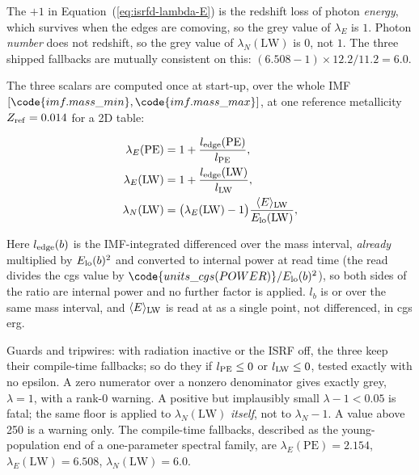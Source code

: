 The $+1$ in
Equation~(\ref{eq:isrfd-lambda-E}) is the redshift loss of photon \emph{energy},
which survives when the edges are comoving, so the grey value of $\lambda_E$ is
$1$. Photon \emph{number} does not redshift, so the grey value of
$\lambda_N(\mathrm{LW})$ is $0$, not $1$. The three shipped fallbacks are mutually
consistent on this: $(6.508 - 1)\times 12.2/11.2 = 6.0$.

The three scalars are computed once at start-up, over the whole IMF
$[\code{imf.mass\_min}, \code{imf.mass\_max}]$, at one reference metallicity
$Z_{\rm ref} = 0.014$ for a 2D table:

\begin{align}
  \lambda_E(\mathrm{PE}) &= 1 + \frac{l_{\rm edge}(\mathrm{PE})}{l_{\rm PE}},
  \label{eq:isrfd-lambda-pe-table} \\
  \lambda_E(\mathrm{LW}) &= 1 + \frac{l_{\rm edge}(\mathrm{LW})}{l_{\rm LW}},
  \label{eq:isrfd-lambda-lw-table} \\
  \lambda_N(\mathrm{LW}) &= \big(\lambda_E(\mathrm{LW}) - 1\big)
    \frac{\langle E\rangle_{\rm LW}}{E_{\rm lo}(\mathrm{LW})},
  \label{eq:isrfd-lambda-n-table}
\end{align}

Here $l_{\rm edge}(b)$ is the
IMF-integrated  differenced over
the mass interval, \emph{already} multiplied by $E_{\rm lo}(b)^2$ and converted to
internal power at read time (the read divides the cgs value by
$\code{units\_cgs(POWER)}/E_{\rm lo}(b)^2$), so both sides of the ratio
are internal power and no further factor is applied. $l_b$ is
 or
 over the same mass interval, and
$\langle E\rangle_{\rm LW}$ is  read at
 as a single point, not differenced, in cgs erg.

Guards and tripwires: with radiation inactive or the ISRF off, the three keep
their compile-time fallbacks; so do they if
$l_{\rm PE} \le 0$ or $l_{\rm LW} \le 0$, tested exactly with no epsilon. A zero
numerator over a nonzero denominator gives exactly grey, $\lambda = 1$, with a
rank-0 warning. A positive but implausibly small
$\lambda - 1 < 0.05$ is fatal; the same floor is applied to
$\lambda_N(\mathrm{LW})$ \emph{itself}, not to $\lambda_N - 1$. A value above
250 is a warning only. The compile-time fallbacks, described as the
young-population end of a one-parameter spectral family, are
$\lambda_E(\mathrm{PE}) = 2.154$, $\lambda_E(\mathrm{LW}) = 6.508$,
$\lambda_N(\mathrm{LW}) = 6.0$.


